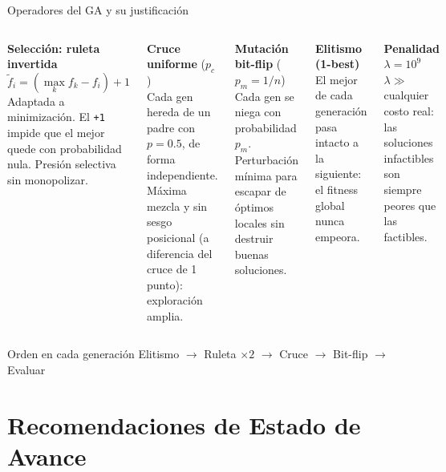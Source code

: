 \documentclass[aspectratio=169, 12pt]{beamer}
\newcommand{\acento}[1]{\textcolor{Verde}{\textbf{#1}}}
\newcommand{\gris}[1]{\textcolor{GrisAzul}{#1}}
\begin{document}
\begin{frame}{Operadores del GA y su justificación}
  \footnotesize
  \begin{columns}[T]
    \acento{Selección: ruleta invertida}
    {\setlength\abovedisplayskip{2pt}\setlength\belowdisplayskip{2pt}
    \[ \tilde{f}_i = (\max_k f_k - f_i) + 1 \]}
    \gris{Adaptada a minimización. El \texttt{+1} impide que el mejor quede con probabilidad nula. Presión selectiva sin monopolizar.}
    \vspace{0.5em}

    \acento{Cruce uniforme} ($p_c$)\\
    \gris{Cada gen hereda de un padre con $p=0.5$, de forma independiente. Máxima mezcla y sin sesgo posicional (a diferencia del cruce de 1 punto): exploración amplia.}

    \acento{Mutación bit-flip} ($p_m = 1/n$)\\
    \gris{Cada gen se niega con probabilidad $p_m$. Perturbación mínima para escapar de óptimos locales sin destruir buenas soluciones.}
    \vspace{0.5em}

    \acento{Elitismo (1-best)}\\
    \gris{El mejor de cada generación pasa intacto a la siguiente: el fitness global nunca empeora.}
    \vspace{0.5em}

    \acento{Penalidad} $\lambda = 10^9$\\
    \gris{$\lambda \gg$ cualquier costo real: las soluciones infactibles son siempre peores que las factibles.}
  \end{columns}
  \vspace{0.4em}
  \begin{block}{Orden en cada generación}
    \footnotesize Elitismo $\rightarrow$ Ruleta $\times 2$ $\rightarrow$ Cruce $\rightarrow$ Bit-flip $\rightarrow$ Evaluar
  \end{block}
\end{frame}

\section{Recomendaciones de Estado de Avance}
\end{document}
